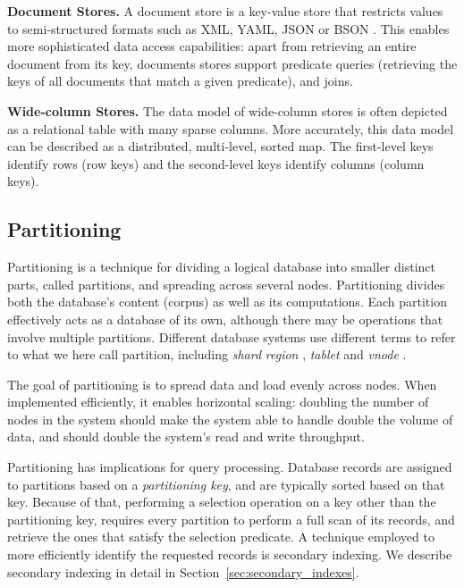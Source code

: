 \bigskip
\noindent
\textbf{Document Stores.}
A document store is a key-value store that restricts values to semi-structured formats such as
XML, YAML, JSON or BSON \cite{bson:spec}.
This enables more sophisticated data access capabilities:
apart from retrieving an entire document from its key, documents stores support predicate queries
(retrieving the keys of all documents that match a given predicate), and joins.

\bigskip
\noindent
\textbf{Wide-column Stores.}
The data model of wide-column stores is often depicted as a relational table with many sparse columns.
More accurately, this data model can be described as a distributed, multi-level, sorted map.
The first-level keys identify rows (row keys) and the second-level keys identify columns (column keys).

\subsection{Partitioning}
\label{sec:partitioning}

Partitioning is a technique for dividing a logical database into smaller distinct parts, called partitions, and spreading
across several nodes.
Partitioning divides both the database's content (corpus) as well as its computations.
Each partition effectively acts as a database of its own, although there may be operations that involve multiple partitions.
Different database systems use different terms to refer to what we here call partition, including \textit{shard} \cite{mongo:shards, elastic:shards}
\textit{region} \cite{hbase:regions}, \textit{tablet} \cite{bigtable:tablets} and \textit{vnode} \cite{cassandra:vnodes, riak:vnodes}.

The goal of partitioning is to spread data and load evenly across nodes.
When implemented efficiently, it enables horizontal scaling:
doubling the number of nodes in the system should make the system able to handle double the volume of data, and
should double the system's read and write throughput.

Partitioning has implications for query processing.
Database records are assigned to partitions based on a \textit{partitioning key},
and are typically sorted based on that key.
Because of that, performing a selection operation on a key other than the partitioning key,
requires every partition to perform a full scan of its records, and retrieve the ones that satisfy the selection predicate.
A technique employed to more efficiently identify the requested records is secondary indexing.
We describe secondary indexing in detail in Section~\ref{sec:secondary_indexes}.

